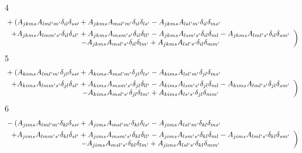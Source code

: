 \documentclass[aps,preprint]{revtex4}%
\begin{document}
4%
\begin{align}
&  +\left(  A_{jkms}A_{lml^{\prime}m^{\prime}}\delta_{il}\delta_{ss\prime
}+A_{jkms}A_{msl^{\prime}m^{\prime}}\delta_{il}\delta_{ls^{\prime}}%
-A_{jkms}A_{lsl^{\prime}m^{\prime}}\delta_{il}\delta_{ms^{\prime}}\right. \\
&  \left.
\begin{array}
[c]{c}%
+A_{jkms}A_{lmm^{\prime}s^{\prime}}\delta_{il}\delta_{sl^{\prime}}%
+A_{jkms}A_{msm^{\prime}s^{\prime}}\delta_{il}\delta_{ll^{\prime}}%
-A_{jkms}A_{lsm^{\prime}s^{\prime}}\delta_{il}\delta_{ml}-A_{jkms}%
A_{lml^{\prime}s^{\prime}}\delta_{il}\delta_{sm^{\prime}}\\
-A_{jkms}A_{msl^{\prime}s^{\prime}}\delta_{il}\delta_{lm^{\prime}}%
+A_{jkms}A_{lsl^{\prime}s^{\prime}}\delta_{il}\delta_{mm^{\prime}}%
\end{array}
\right)
\end{align}
5%
\begin{align}
&  +\left(  A_{kims}A_{lml^{\prime}m^{\prime}}\delta_{jl}\delta_{ss\prime
}+A_{kims}A_{msl^{\prime}m^{\prime}}\delta_{jl}\delta_{ls^{\prime}}%
-A_{kims}A_{lsl^{\prime}m^{\prime}}\delta_{jl}\delta_{ms^{\prime}}\right. \\
&  \left.
\begin{array}
[c]{c}%
+A_{kims}A_{lmm^{\prime}s^{\prime}}\delta_{jl}\delta_{sl^{\prime}}%
+A_{kims}A_{msm^{\prime}s^{\prime}}\delta_{jl}\delta_{ll^{\prime}}%
-A_{kims}A_{lsm^{\prime}s^{\prime}}\delta_{jl}\delta_{ml}-A_{kims}%
A_{lml^{\prime}s^{\prime}}\delta_{jl}\delta_{sm^{\prime}}\\
-A_{kims}A_{msl^{\prime}s^{\prime}}\delta_{jl}\delta_{lm^{\prime}}%
+A_{kims}A_{ls^{\prime}s^{\prime}}\delta_{jl}\delta_{mm^{\prime}}%
\end{array}
\right)
\end{align}
6%
\begin{align}
&  -\left(  A_{jims}A_{lml^{\prime}m^{\prime}}\delta_{kl}\delta_{ss\prime
}+A_{jims}A_{msl^{\prime}m^{\prime}}\delta_{kl}\delta_{ls^{\prime}}%
-A_{jims}A_{lsl^{\prime}m^{\prime}}\delta_{kl}\delta_{ms^{\prime}}\right. \\
&  \left.
\begin{array}
[c]{c}%
+A_{jims}A_{lmm^{\prime}s^{\prime}}\delta_{kl}\delta_{sl^{\prime}}%
+A_{jims}A_{msm^{\prime}s^{\prime}}\delta_{kl}\delta_{ll^{\prime}}%
-A_{jims}A_{lsm^{\prime}s^{\prime}}\delta_{kl}\delta_{ml}-A_{jims}%
A_{lml^{\prime}s^{\prime}}\delta_{kl}\delta_{sm^{\prime}}\\
-A_{jims}A_{msl^{\prime}s^{\prime}}\delta_{kl}\delta_{lm^{\prime}}%
+A_{jims}A_{lsl^{\prime}s^{\prime}}\delta_{kl}\delta_{mm^{\prime}}%
\end{array}
\right)
\end{align}
\end{document}
